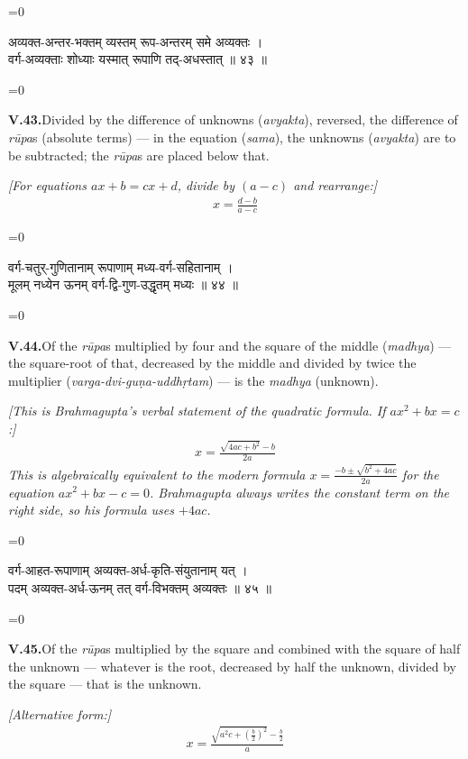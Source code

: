 \documentclass[11pt,a4paper]{article}
\newcommand{\dev}[1]{{\devanagarifont\color{sktcolor}#1}}
\newcommand{\iast}[1]{\textit{#1}}
\newenvironment{paracol}[1]{\begingroup}{\endgroup}
\newcommand{\switchcolumn}[1][]{%
  \ifnum#1=0\relax\else\par\nobreak\vspace{0.5em}\par\nobreak\fi%
}
\begin{document}
\begin{paracol}{2}
\switchcolumn[0]
\dev{%
अव्यक्त-अन्तर-भक्तम् व्यस्तम् रूप-अन्तरम् समे अव्यक्तः ।\\
वर्ग-अव्यक्ताः शोध्याः यस्मात् रूपाणि तद्-अधस्तात् ॥ ४३ ॥
}

\switchcolumn[1]
\textbf{V.43.}\quad Divided by the difference of unknowns
(\iast{avyakta}), reversed, the difference of \iast{rūpa}s (absolute
terms) — in the equation (\iast{sama}), the unknowns (\iast{avyakta})
are to be subtracted; the \iast{rūpa}s are placed below that.

\medskip
\textit{[For equations $ax + b = cx + d$, divide by $(a-c)$ and rearrange:]}
\begin{align*}
x = \frac{d - b}{a - c}
\end{align*}
\end{paracol}

\vspace{0.3cm}

\begin{paracol}{2}
\switchcolumn[0]
\dev{%
वर्ग-चतुर्-गुणितानाम् रूपाणाम् मध्य-वर्ग-सहितानाम् ।\\
मूलम् नध्येन ऊनम् वर्ग-द्वि-गुण-उद्धृतम् मध्यः ॥ ४४ ॥
}

\switchcolumn[1]
\textbf{V.44.}\quad Of the \iast{rūpa}s multiplied by four and the
square of the middle (\iast{madhya}) — the square-root of that,
decreased by the middle and divided by twice the multiplier
(\iast{varga-dvi-guṇa-uddhṛtam}) — is the \iast{madhya} (unknown).

\medskip
\textit{[This is Brahmagupta's verbal statement of the quadratic formula.
If $ax^2 + bx = c$:]}
\begin{align*}
x = \frac{\sqrt{4ac + b^2} - b}{2a}
\end{align*}
\textit{This is algebraically equivalent to the modern formula
$x = \frac{-b \pm \sqrt{b^2 + 4ac}}{2a}$ for the equation
$ax^2 + bx - c = 0$. Brahmagupta always writes the constant term
on the right side, so his formula uses $+4ac$.}
\end{paracol}

\vspace{0.3cm}

\begin{paracol}{2}
\switchcolumn[0]
\dev{%
वर्ग-आहत-रूपाणाम् अव्यक्त-अर्ध-कृति-संयुतानाम् यत् ।\\
पदम् अव्यक्त-अर्ध-ऊनम् तत् वर्ग-विभक्तम् अव्यक्तः ॥ ४५ ॥
}

\switchcolumn[1]
\textbf{V.45.}\quad Of the \iast{rūpa}s multiplied by the square
and combined with the square of half the unknown — whatever is the
root, decreased by half the unknown, divided by the square — that is
the unknown.

\medskip
\textit{[Alternative form:]}
\begin{align*}
x = \frac{\sqrt{a^2c + (\frac{b}{2})^2} - \frac{b}{2}}{a}
\end{align*}
\end{paracol}
\end{document}
